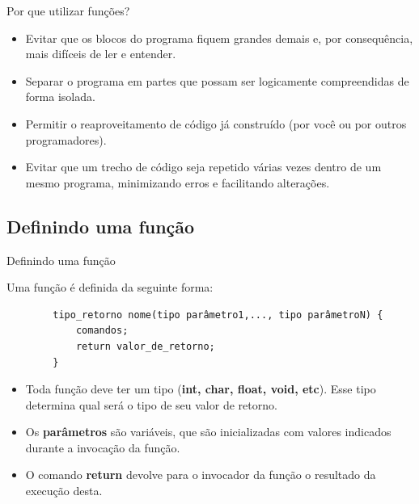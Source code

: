 \documentclass[handout]{beamer}
\begin{document}
\begin{frame}{Por que utilizar funções?}

    \begin{itemize}[<+->]
        \item Evitar que os blocos do programa fiquem grandes demais e, por consequência, mais difíceis de ler e entender.
        \item Separar o programa em partes que possam ser logicamente compreendidas de forma isolada.
        \item Permitir o reaproveitamento de código já construído (por você ou por outros programadores).
        \item Evitar que um trecho de código seja repetido várias vezes dentro de um mesmo programa, minimizando erros e facilitando alterações. 
    \end{itemize}
\end{frame}


\subsection{Definindo uma função}

\begin{frame}[fragile]{Definindo uma função}

    Uma função é definida da seguinte forma:
    
    \begin{verbatim}
        tipo_retorno nome(tipo parâmetro1,..., tipo parâmetroN) {
            comandos;
            return valor_de_retorno;
        }
    \end{verbatim}

    \begin{itemize}
        \item Toda função deve ter um tipo ({\bf int, char, float, void, etc}). Esse tipo determina qual será o tipo de seu valor de retorno.
        \item Os {\bf parâmetros} são variáveis, que são inicializadas com valores indicados durante a invocação da função.
        \item O comando {\bf return} devolve para o invocador da função o resultado da execução desta.
    \end{itemize}
\end{frame}
\end{document}
